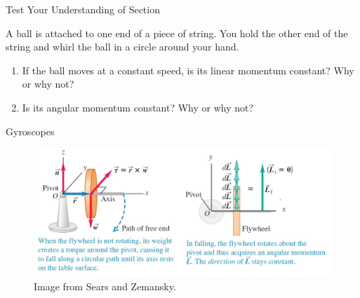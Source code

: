 \documentclass[]{beamer}
\begin{document}
\begin{frame}

  Test Your Understanding of Section

  \vspace{7mm}


  A ball is attached to one end of a
piece of string. You hold the other end of the string and whirl the ball in a circle around
your hand. 
\vspace{7mm}

\begin{enumerate}
  \item If the ball moves at a constant speed, is its linear momentum constant?
Why or why not?
\item  Is its angular momentum constant? Why or why not? 
\end{enumerate}


  
  \end{frame}




\begin{frame}

  Gyroscopes 

  \vspace{7mm}


   \begin{figure}[h!]  
    \includegraphics[width=1.2\textwidth]{images/13.jpg}
    \caption{Image from Sears and Zemansky.}
  \end{figure}
  
  \end{frame}

\end{document}
